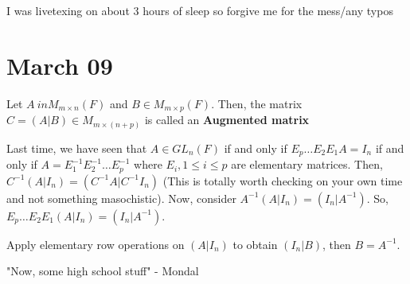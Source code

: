 \documentclass[12pt, letterpaper]{article}
\begin{document}
I was livetexing on about 3 hours of sleep so forgive me for the mess/any typos
  \section{March 09}
  \begin{definition}
    Let $A \ in M_{m \times n}(F)$ and $B \in M_{m \times p}(F)$.
    Then, the matrix $C = (A|B) \in M_{m\times (n+p)}$ is called an \textbf{Augmented matrix}
  \end{definition}
  Last time, we have seen that $A \in GL_n(F)$ if and only if $E_p \ldots E_2E_1A = I_n$ if and only if $A = E_1^{-1} E_2^{-1} \ldots E_p^{-1}$ where $E_i, 1\leq i \leq p$ are elementary matrices.
  Then, $C^{-1}(A|I_n) = (C^{-1}A | C^{-1}I_n)$ (This is totally worth checking on your own time and not something masochistic).
  Now, consider $A^{-1}(A|I_n) = (I_n|A^{-1})$.
  So, $E_p\ldots E_2E_1(A|I_n) = (I_n|A^{-1})$.
  \begin{remark}[Fact]
    Apply elementary row operations on $(A|I_n)$ to obtain $(I_n|B)$, then $B = A^{-1}$.
  \end{remark}
  \begin{remark}
    "Now, some high school stuff" - Mondal
  \end{remark}
\end{document}
